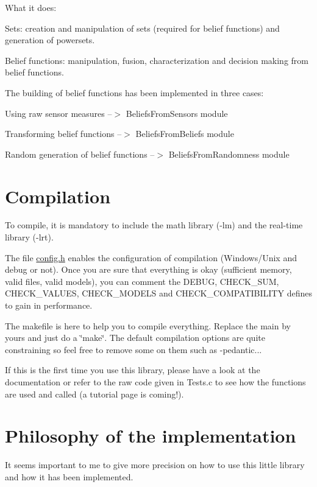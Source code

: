 What it does\-: \begin{DoxyItemize}
\item Sets\-: creation and manipulation of sets (required for belief functions) and generation of powersets. \item Belief functions\-: manipulation, fusion, characterization and decision making from belief functions.\end{DoxyItemize}
The building of belief functions has been implemented in three cases\-: \begin{DoxyItemize}
\item Using raw sensor measures --$>$ Beliefs\-From\-Sensors module \item Transforming belief functions --$>$ Beliefs\-From\-Beliefs module \item Random generation of belief functions --$>$ Beliefs\-From\-Randomness module\end{DoxyItemize}
\hypertarget{index_compil_sec}{}\section{Compilation}\label{index_compil_sec}
To compile, it is mandatory to include the math library (-\/lm) and the real-\/time library (-\/lrt). \par


The file \hyperlink{config_8h}{config.\-h} enables the configuration of compilation (Windows/\-Unix and debug or not). Once you are sure that everything is okay (sufficient memory, valid files, valid models), you can comment the D\-E\-B\-U\-G, C\-H\-E\-C\-K\-\_\-\-S\-U\-M, C\-H\-E\-C\-K\-\_\-\-V\-A\-L\-U\-E\-S, C\-H\-E\-C\-K\-\_\-\-M\-O\-D\-E\-L\-S and C\-H\-E\-C\-K\-\_\-\-C\-O\-M\-P\-A\-T\-I\-B\-I\-L\-I\-T\-Y defines to gain in performance. \par
 The makefile is here to help you to compile everything. Replace the main by yours and just do a \char`\"{}make\char`\"{}. The default compilation options are quite constraining so feel free to remove some on them such as -\/pedantic...

If this is the first time you use this library, please have a look at the documentation or refer to the raw code given in Tests.\-c to see how the functions are used and called (a tutorial page is coming!).\hypertarget{index_ref_philo}{}\section{Philosophy of the implementation}\label{index_ref_philo}
It seems important to me to give more precision on how to use this little library and how it has been implemented.


